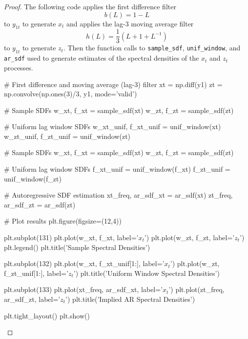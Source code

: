 \documentclass[oneside,reqno]{amsart}
\theoremstyle{definition}
\begin{document}
\begin{proof}
The following code applies the first difference filter 
\[
	b(L) = 1-L
\]
to $y_{1t}$ to generate $x_t$ and applies the lag-3 moving average filter 
\[
	h(L) = \frac{1}{3}(L + 1 + L^{-1})
\] 
to $y_{1t}$ to generate $z_t$. Then the function calls to \texttt{sample_sdf},  \texttt{unif_window}, and \texttt{ar_sdf} used to generate estimates of the spectral densities of the $x_t$ and $z_t$ processes. 


\begin{python3code}
# First difference and moving average (lag-3) filter 
xt = np.diff(y1)
zt = np.convolve(np.ones(3)/3, y1, mode='valid')

# Sample SDFs
w_xt, f_xt = sample_sdf(xt)
w_zt, f_zt = sample_sdf(zt)

# Uniform lag window SDFs
w_xt_unif, f_xt_unif = unif_window(xt)
w_zt_unif, f_zt_unif = unif_window(zt)

# Sample SDFs
w_xt, f_xt = sample_sdf(xt)
w_zt, f_zt = sample_sdf(zt)

# Uniform lag window SDFs
f_xt_unif = unif_window(f_xt)
f_zt_unif = unif_window(f_zt)

# Autoregressive SDF estimation 
xt_freq, ar_sdf_xt = ar_sdf(xt)
zt_freq, ar_sdf_zt = ar_sdf(zt)

# Plot results
plt.figure(figsize=(12,4))

plt.subplot(131)
plt.plot(w_xt, f_xt, label='$x_t$')
plt.plot(w_zt, f_zt, label='$z_t$')
plt.legend()
plt.title('Sample Spectral Densities')

plt.subplot(132)
plt.plot(w_xt, f_xt_unif[1:], label='$x_t$')
plt.plot(w_zt, f_zt_unif[1:], label='$z_t$')
plt.title('Uniform Window Spectral Densities')

plt.subplot(133)
plt.plot(xt_freq, ar_sdf_xt, label='$x_t$')
plt.plot(zt_freq, ar_sdf_zt, label='$z_t$')
plt.title('Implied AR Spectral Densities')

plt.tight_layout()
plt.show()
\end{python3code}


\end{proof}
\end{document}

